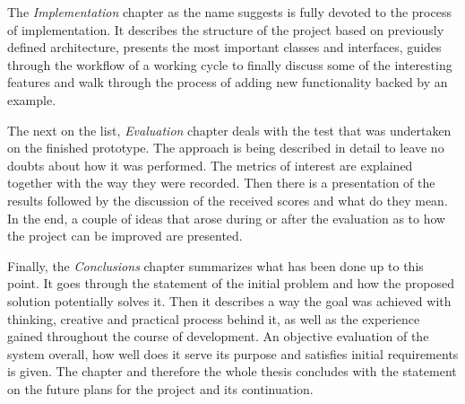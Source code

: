 The \textit{Implementation} chapter as the name suggests is fully devoted to the process of implementation. It describes the structure of the project based on previously defined architecture, presents the most important classes and interfaces, guides through the workflow of a working cycle to finally discuss some of the interesting features and walk through the process of adding new functionality backed by an example.

The next on the list, \textit{Evaluation} chapter deals with the test that was undertaken on the finished prototype. The approach is being described in detail to leave no doubts about how it was performed. The metrics of interest are explained together with the way they were recorded. Then there is a presentation of the results followed by the discussion of the received scores and what do they mean. In the end, a couple of ideas that arose during or after the evaluation as to how the project can be improved are presented.

Finally, the \textit{Conclusions} chapter summarizes what has been done up to this point. It goes through the statement of the initial problem and how the proposed solution potentially solves it. Then it describes a way the goal was achieved with thinking, creative and practical process behind it, as well as the experience gained throughout the course of development. An objective evaluation of the system overall, how well does it serve its purpose and satisfies initial requirements is given. The chapter and therefore the whole thesis concludes with the statement on the future plans for the project and its continuation.

